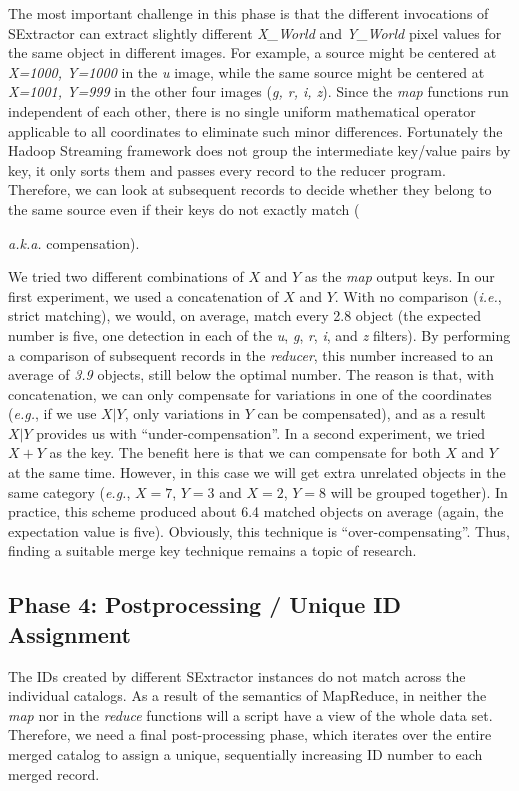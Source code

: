 The most important challenge in this phase is that the different invocations of SExtractor can extract slightly different \textit{X\_World} and \textit{Y\_World} pixel values for the same object in different images. For example, a source might be centered at \textit{X=1000, Y=1000} in the \textit{u} image, while the same source might be centered at \textit{X=1001, Y=999} in the other four images (\textit{g, r, i, z}). Since the \textit{map} functions run independent of each other, there is no single uniform mathematical operator applicable to all coordinates to eliminate such minor differences.
Fortunately the Hadoop Streaming framework does not group the intermediate key/value pairs by key, it only sorts them and passes every record to the reducer program. Therefore, we can look at subsequent records to decide whether they belong to the same source even if their keys do not exactly match ({\textit{a.k.a.} compensation).  

We tried two different combinations of $X$ and $Y$ as the \textit{map} output keys. In our first experiment, we used a concatenation of $X$ and $Y$. With no comparison (\textit{i.e.}, strict matching), we would, on average, match every 2.8 object (the expected number is five, one detection in each of the \textit{u}, \textit{g}, \textit{r}, \textit{i}, and \textit{z} filters). By performing a comparison of subsequent records in the \textit{reducer}, this number increased to an average of \textit{3.9} objects, still below the optimal number. The reason is that, with concatenation, we can only compensate for variations in one of the coordinates (\textit{e.g.}, if we use $X|Y$, only variations in $Y$ can be compensated), and as a result $X|Y$ provides us with ``under-compensation''.
In a second experiment, we tried $X+Y$ as the key. The benefit here is that we can compensate for both $X$ and $Y$ at the same time. However, in this case we will get extra unrelated objects in the same category (\textit{e.g.}, $X=7$, $Y=3$ and $X=2$, $Y=8$ will be grouped together). In practice, this scheme produced about 6.4 matched objects on average (again, the expectation value is five). Obviously, this technique is ``over-compensating''. Thus, finding a suitable merge key technique remains a topic of research.

\subsection{Phase 4: Postprocessing / Unique ID Assignment} 
The IDs created by different SExtractor instances do not match across the individual catalogs. As a result of the semantics of MapReduce, in neither the \textit{map} nor in the \textit{reduce} functions will a script have a view of the whole data set. Therefore, we need a final post-processing phase, which iterates over the entire merged catalog to assign a unique, sequentially increasing ID number to each merged record.

}
